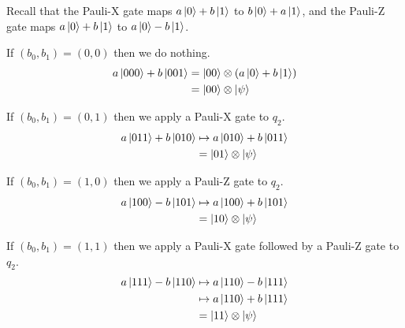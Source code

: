 \documentclass[12pt,letterpaper]{article}
\newcommand\tensor{\otimes}
\begin{document}
Recall that the Pauli-X gate maps $a\ket{0} + b\ket{1}$ to $b\ket{0} + a\ket{1}$,
and the Pauli-Z gate maps $a\ket{0} + b\ket{1}$ to $a\ket{0} - b\ket{1}$.

If $(b_0, b_1) = (0, 0)$ then we do nothing.
\begin{align}
a\ket{000} + b\ket{001} 
&= \ket{00} \tensor (a\ket{0} + b\ket{1}) \\
&= \ket{00} \tensor \ket{\psi}
\end{align}

If $(b_0, b_1) = (0, 1)$ then we apply a Pauli-X gate to $q_2$.
\begin{align}
a\ket{011} + b\ket{010} 
	&\mapsto a\ket{010} + b\ket{011} \\
    &= \ket{01} \tensor \ket{\psi}
\end{align}

If $(b_0, b_1) = (1, 0)$ then we apply a Pauli-Z gate to $q_2$.
\begin{align}
	a\ket{100} - b\ket{101} 
		& \mapsto a\ket{100} + b\ket{101} \\
 		& = \ket{10} \tensor \ket{\psi}
\end{align}

If $(b_0, b_1) = (1, 1)$ then we apply a Pauli-X gate followed by a 
Pauli-Z gate to $q_2$.
\begin{align}
	a\ket{111} - b\ket{110} 
		&\mapsto a\ket{110} - b\ket{111} \\
		&\mapsto  a\ket{110} + b\ket{111} \\
		&= \ket{11} \tensor \ket{\psi}
\end{align}
\end{document}
